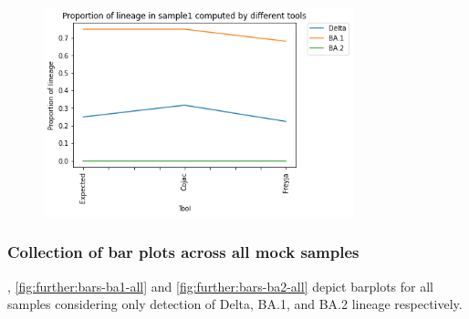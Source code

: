         \begin{figure}[H]
        	\centering
            \includegraphics[width=0.8\textwidth]{figures/further/line-s1.png}
            \label{fig:further:line-s1}
        \end{figure}
        
        \subsubsection{Collection of bar plots across all mock samples} \label{sec:appendix:figures:bars-all}
        , \cref{fig:further:bars-ba1-all} and \cref{fig:further:bars-ba2-all} depict barplots for all samples considering only detection of Delta, BA.1, and BA.2 lineage respectively.
        
